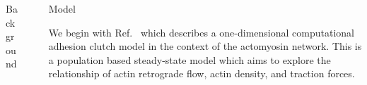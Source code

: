 \documentclass{beamer}
\newlength{\sepwidth}
\newlength{\colwidth}
\newcommand{\separatorcolumn}{\begin{column}{\sepwidth}\end{column}}
\begin{document}
\begin{frame}[t]
\begin{columns}[t]
\begin{column}{\colwidth}
\begin{block}{Background}
\end{block}

\end{column}
\separatorcolumn%


\begin{column}{\colwidth}

\begin{block}{Model}

We begin with Ref.~\cite{craig_membrane_2012} which describes a one-dimensional computational adhesion clutch model in the context of the actomyosin network. This is a population based steady-state model which aims to explore the relationship of actin retrograde flow, actin density, and traction forces.



\end{block}
\end{column}
\end{columns}
\end{frame}
\end{document}
